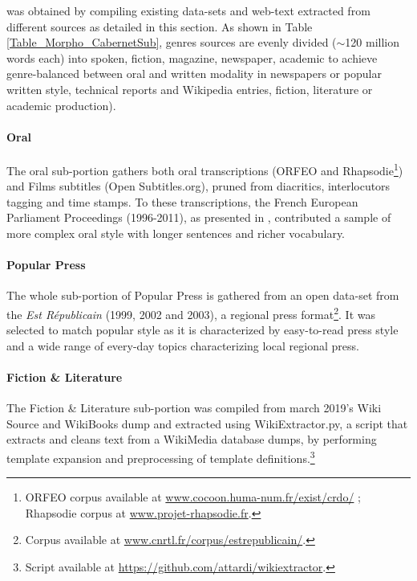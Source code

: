 \Cabernet was obtained by compiling existing data-sets and web-text extracted from different sources as detailed in this section. As shown in Table \ref{Table_Morpho_CabernetSub}, genres sources are evenly divided ($\sim$120 million words each) into spoken, fiction, magazine, newspaper, academic to achieve genre-balanced between oral and written modality in newspapers or popular written style, technical reports and Wikipedia entries, fiction, literature or academic production).

\paragraph{\Cabernet Oral} \label{subsec:DescribeCaBeRnetOral}
The oral sub-portion gathers both oral transcriptions (\textsc{ORFEO} and Rhapsodie\footnote{\textsc{ORFEO} corpus available at \url{www.cocoon.huma-num.fr/exist/crdo/} ; Rhapsodie corpus at \url{www.projet-rhapsodie.fr}.}) and Films subtitles (Open Subtitles.org), pruned from diacritics, interlocutors tagging and time stamps. To these transcriptions, the French European Parliament Proceedings (1996-2011), as presented in \citet{koehn-2005-europarl}, contributed a sample of more complex oral style with longer sentences and richer vocabulary.%

\paragraph{\Cabernet Popular Press} \label{subsec:DescribeCaBeRnetPop}
The whole sub-portion of Popular Press is gathered from an open data-set from the \textit{Est  Républicain} (1999, 2002 and 2003), a regional press format\footnote{Corpus available at \url{www.cnrtl.fr/corpus/estrepublicain/}.}. %
It was selected to match popular style as it is characterized by easy-to-read press style and a wide range of every-day topics characterizing local regional press.

\paragraph{\Cabernet Fiction \& Literature} \label{subsec:DescribeCaBeRnetFic}
The Fiction \& Literature sub-portion was compiled from march 2019's Wiki Source and WikiBooks dump and extracted using WikiExtractor.py, a script that extracts and cleans text from a WikiMedia database dumps, by performing template expansion and preprocessing of template definitions.\footnote{Script available at \url{https://github.com/attardi/wikiextractor}.}

